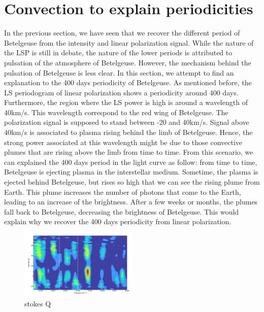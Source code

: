 \documentclass{aa}
\begin{document}
\section{Convection to explain periodicities}

In the previous section, we have seen that we recover the different period of Betelgeuse from the intensity and linear polarization signal. While the nature of the LSP is still in debate, the nature of the lower periods is attributed to pulsation of the atmosphere of Betelgeuse. However, the mechanism behind the pulsation of Betelgeuse is less clear. In this section, we attempt to find an explanation to the 400 days periodicity of Betelgeuse. As mentioned before, the LS periodogram of linear polarization shows a periodicity around 400 days. Furthermore, the region where the LS power is high is around a wavelength of 40km/s. This wavelength correspond to the red wing of Betelgeuse. The polarization signal is supposed to stand between -20 and 40km/s. Signal above 40km/s is associated to plasma rising behind the limb of Betelgeuse. Hence, the strong power associated at this wavelength might be due to those convective plumes that are rising above the limb from time to time. From this scenario, we can explained the 400 days period in the light curve as follow: from time to time, Betelgeuse is ejecting plasma in the interstellar medium. Sometime, the plasma is ejected behind Betelgeuse, but rises so high that we can see the rising plume from Earth. This plume increases the number of photons that come to the Earth, leading to an increase of the brightness. After a few weeks or months, the plumes fall back to Betelgeuse, decreasing the brightness of Betelgeuse. This would explain why we recover the 400 days periodicity from linear polarization. 




\begin{figure}[!h]
    \centering
    \includegraphics[width=0.5\textwidth]{LS stokes Q.png}
    \caption{stokes Q}
    \label{LS Q}
\end{figure}
\end{document}
